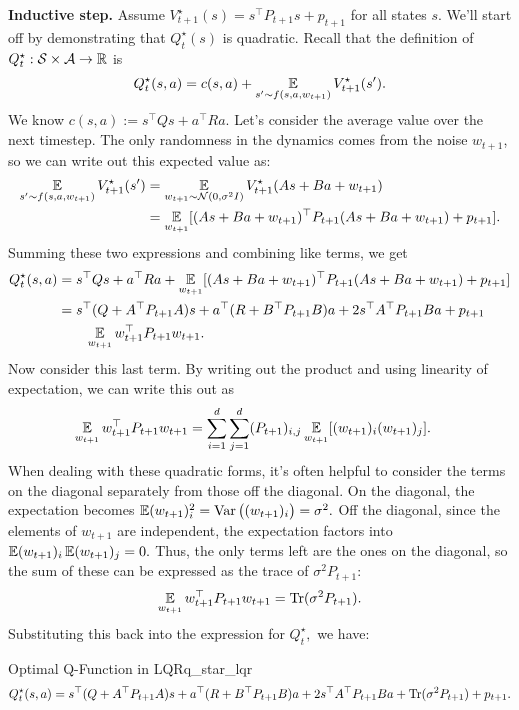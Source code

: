 \documentclass[../main/main]{subfiles}
\begin{document}
\textbf{Inductive step.} Assume $V^\star_{t+1}(s) = s^\top P_{t+1} s + p_{t+1}$
for all states $s.$ We'll start off by demonstrating that $Q^\star_t(s)$ is quadratic.
Recall that the definition of $Q^\star_t : \mathcal{S} \times \mathcal{A} \to \mathbb{R}$ is \[
    Q^\star_t(s, a) = c(s, a) + \operatorname*{\mathbb{E}}_{s' \sim f(s, a, w_{t+1})} V^\star_{t+1}(s').
\]
We know $c(s, a) := s^\top Q s + a^\top R a.$ Let's consider the average value
over the next timestep. The only randomness in the dynamics comes from the noise
$w_{t+1}$, so we can write out this expected value as:
\begin{align*}
    \operatorname*{\mathbb{E}}_{s' \sim f(s, a, w_{t+1})} V^\star_{t+1}(s') &= \operatorname*{\mathbb{E}}_{w_{t+1} \sim \mathcal{N}(0, \sigma^2 I)} V^\star_{t+1}(As + Ba + w_{t+1}) \\
    &= \operatorname*{\mathbb{E}}_{w_{t+1}} [ (As + Ba + w_{t+1})^\top P_{t+1} (As + Ba + w_{t+1}) + p_{t+1} ].
\end{align*}
Summing these two expressions and combining like terms, we get \begin{align*}
    Q^\star_t(s, a) &= s^\top Q s + a^\top R a + \operatorname*{\mathbb{E}}_{w_{t+1}} [(As + Ba + w_{t+1})^\top P_{t+1} (As + Ba + w_{t+1}) + p_{t+1}] \\
    &= s^\top (Q + A^\top P_{t+1} A)s + a^\top (R + B^\top P_{t+1} B) a + 2 s^\top A^\top P_{t+1} B a + p_{t+1} \\
    &\qquad \operatorname*{\mathbb{E}}_{w_{t+1}} w_{t+1}^\top P_{t+1} w_{t+1}.
\end{align*}
Now consider this last term. By writing out the product and using linearity of
expectation, we can write this out as \begin{align*}
    \operatorname*{\mathbb{E}}_{w_{t+1}} w_{t+1}^\top P_{t+1} w_{t+1} &= \sum_{i=1}^d \sum_{j=1}^d (P_{t+1})_{i, j} \operatorname*{\mathbb{E}}_{w_{t+1}} [(w_{t+1})_i (w_{t+1})_j].
\end{align*}
When dealing with these quadratic forms, it's often helpful to consider the terms
on the diagonal separately from those off the diagonal. On the diagonal, the
expectation becomes $\operatorname*{\mathbb{E}} (w_{t+1})_i^2 = \operatorname*{\textrm{Var}} \big((w_{t+1})_i \big) = \sigma^2.$
Off the diagonal, since the elements of $w_{t+1}$ are independent,
the expectation factors into $\operatorname*{\mathbb{E}} (w_{t+1})_i \operatorname*{\mathbb{E}} (w_{t+1})_j = 0.$
Thus, the only terms left are the ones on the diagonal, so the sum of these can
be expressed as the trace of $\sigma^2 P_{t+1}$: \[
    \operatorname*{\mathbb{E}}_{w_{t+1}} w_{t+1}^\top P_{t+1} w_{t+1} = \operatorname*{\textrm{Tr}}(\sigma^2 P_{t+1}).
\]
Substituting this back into the expression for $Q^\star_t,$ we have:

\begin{theorem}{Optimal Q-Function in LQR}{q_star_lqr}
    \[
        Q^\star_t(s, a) = s^\top (Q + A^\top P_{t+1} A) s + a^\top (R + B^\top P_{t+1} B) a
        + 2s^\top A^\top P_{t+1} B a + \operatorname*{\textrm{Tr}}(\sigma^2 P_{t+1}) + p_{t+1}.
    \]
\end{theorem}
\end{document}
